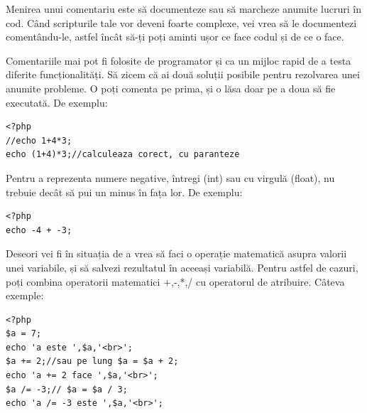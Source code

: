 Menirea unui comentariu este să documenteze sau să marcheze
anumite lucruri în cod. Când scripturile tale vor deveni foarte complexe,
vei vrea să le documentezi comentându-le, astfel încât să-ți
poți aminti ușor ce face codul și de ce o face.


Comentariile mai pot fi folosite de programator
și ca un mijloc rapid de a testa diferite funcționalități.
Să zicem că ai două soluții posibile pentru rezolvarea
unei anumite probleme. O poți comenta pe prima, și
o lăsa doar pe a doua să fie executată. De exemplu:

\begin{lstlisting}
<?php
//echo 1+4*3;
echo (1+4)*3;//calculeaza corect, cu paranteze
\end{lstlisting}

Pentru a reprezenta numere negative, întregi (int)
sau cu virgulă (float), nu trebuie decât să pui un
minus în fața lor. De exemplu:

\begin{lstlisting}
<?php
echo -4 + -3;
\end{lstlisting}

Deseori vei fi în situația de a vrea
să faci o operație matematică
asupra valorii unei variabile,
și să salvezi rezultatul în aceeași variabilă.
Pentru astfel de cazuri, poți combina operatorii
matematici +,-,*,/ cu operatorul de atribuire. Câteva
exemple:
\begin{lstlisting}
<?php
$a = 7;
echo 'a este ',$a,'<br>';
$a += 2;//sau pe lung $a = $a + 2;
echo 'a += 2 face ',$a,'<br>';
$a /= -3;// $a = $a / 3;
echo 'a /= -3 este ',$a,'<br>';
\end{lstlisting}

